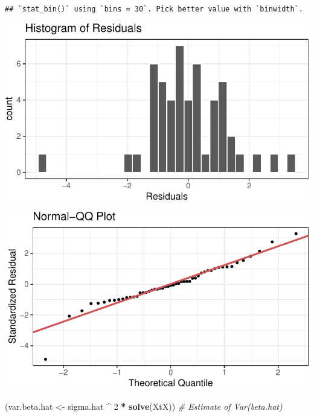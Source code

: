 \documentclass[]{article}
\newenvironment{Shaded}{\begin{snugshade}}{\end{snugshade}}
\newcommand{\CommentTok}[1]{\textcolor[rgb]{0.56,0.35,0.01}{\textit{#1}}}
\newcommand{\DecValTok}[1]{\textcolor[rgb]{0.00,0.00,0.81}{#1}}
\newcommand{\KeywordTok}[1]{\textcolor[rgb]{0.13,0.29,0.53}{\textbf{#1}}}
\newcommand{\NormalTok}[1]{#1}
\newcommand{\OperatorTok}[1]{\textcolor[rgb]{0.81,0.36,0.00}{\textbf{#1}}}
\newcommand{\StringTok}[1]{\textcolor[rgb]{0.31,0.60,0.02}{#1}}
\begin{document}
\begin{Shaded}
\end{Shaded}

\begin{verbatim}
## `stat_bin()` using `bins = 30`. Pick better value with `binwidth`.
\end{verbatim}

\includegraphics{forchapter5_files/figure-latex/05-diagplot-2.pdf}

\begin{Shaded}
\end{Shaded}

\includegraphics{forchapter5_files/figure-latex/05-diagplot-3.pdf}

\begin{Shaded}
\begin{Highlighting}[]
\NormalTok{(var.beta.hat <-}\StringTok{ }\NormalTok{sigma.hat }\OperatorTok{^}\StringTok{ }\DecValTok{2} \OperatorTok{*}\StringTok{ }\KeywordTok{solve}\NormalTok{(XtX))  }\CommentTok{# Estimate of Var(beta.hat)}
\end{Highlighting}
\end{Shaded}
\end{document}
